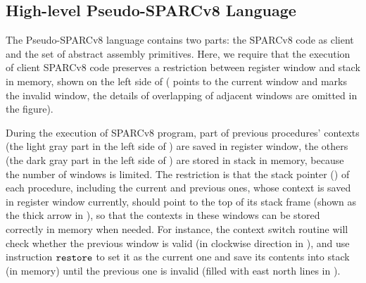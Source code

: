 \subsection{High-level Pseudo-SPARCv8 Language}
\label{subsec:High-level Pseudo-SPARCv8 Language}

The Pseudo-SPARCv8 language contains two parts:
the SPARCv8 code as client
and the set of abstract assembly primitives.
Here, we require that the execution of client SPARCv8 code
preserves a restriction between register
window and stack in memory, shown
on the left side of
\Fig{\ref{fig:Abstraction of Register Windows and Memory}}
(\regcwp{} points to the current window and \regwim{} marks
the invalid window, the details of overlapping
of adjacent windows are omitted in the figure).
\begin{center}
    
    \vspace*{-0.5em}
    \label{fig:Abstraction of Register Windows and Memory}
    \vspace{-0.5em}
\end{center}
During the execution of SPARCv8 program,
part of previous procedures' contexts
(the light gray part in the left side of
\Fig{\ref{fig:Abstraction of Register Windows and Memory}})
are saved in register window, the others
(the dark gray part in the left side of
\Fig{\ref{fig:Abstraction of Register Windows and Memory}})
are stored in stack in memory,
because the number of windows is limited.
The restriction is that the stack pointer
(\spreg{}) of each procedure,
including the current and previous ones,
whose context is saved in register
window currently, should point to the top of its stack frame
(shown as the thick arrow in
\Fig{\ref{fig:Abstraction of Register Windows and Memory}}),
so that the contexts
in these windows can be stored correctly
in memory when needed. For instance,
the context switch routine will check
whether the previous window is valid
(in clockwise direction in
\Fig{\ref{fig:Abstraction of Register Windows and Memory}}),
and use instruction $\texttt{restore}{}$ to set it as the
current one and save its contents into stack
(in memory) until the previous one is invalid
(filled with east north lines
in \Fig{\ref{fig:Abstraction of Register Windows and Memory}}).
